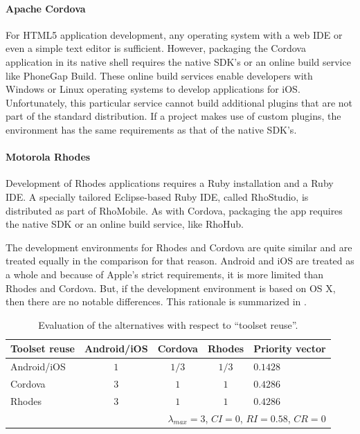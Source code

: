 \paragraph{Apache Cordova} For HTML5 application development, any operating system with a web IDE or even a simple text editor is sufficient. However, packaging the Cordova application in its native shell requires the native SDK's or an online build service like PhoneGap Build. These online build services enable developers with Windows or Linux operating systems to develop applications for iOS. Unfortunately, this particular service cannot build additional plugins that are not part of the standard distribution. If a project makes use of custom plugins, the environment has the same requirements as that of the native SDK's. 

\paragraph{Motorola Rhodes} Development of Rhodes applications requires a Ruby installation and a Ruby IDE. A specially tailored Eclipse-based Ruby IDE, called RhoStudio, is distributed as part of RhoMobile. As with Cordova, packaging the app requires the native SDK or an online build service, like RhoHub. 

The development environments for Rhodes and Cordova are quite similar and are treated equally in the comparison for that reason. Android and iOS are treated as a whole and because of Apple's strict requirements, it is more limited than Rhodes and Cordova. But, if the development environment is based on OS X, then there are no notable differences. This rationale is summarized in .

\begin{table}[h!]
    \centering
    \begin{tabular}{lcccl}
        \hline
        \textbf{Toolset reuse} & Android/iOS & Cordova & Rhodes & Priority vector \\
        \hline
        Android/iOS            & $1$         & $1/3$   & $1/3$  & $0.1428$        \\
        Cordova                & $3$         & $1$     & $1$    & $0.4286$        \\
        Rhodes                 & $3$         & $1$     & $1$    & $0.4286$        \\
        \hline
        \multicolumn{5}{r}{$\lambda_{max} = 3$, $CI = 0$, $RI = 0.58$, $CR = 0$}  \\
        \hline
    \end{tabular}
    \caption{Evaluation of the alternatives with respect to ``toolset reuse''.}
    \label{tab:tr}
\end{table}

